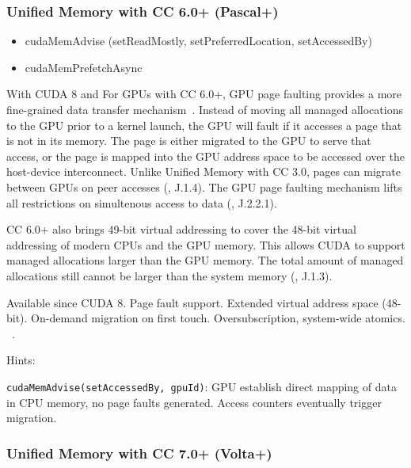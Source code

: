 
\subsubsection{Unified Memory with CC 6.0+ (Pascal+)}

\begin{itemize}
	\item cudaMemAdvise (setReadMostly, setPreferredLocation, setAccessedBy)
	\item cudaMemPrefetchAsync
\end{itemize}

With CUDA 8 and For GPUs with CC 6.0+, GPU page faulting provides a more fine-grained data transfer mechanism~\cite{nvidia2017cuda80}.
Instead of moving all managed allocations to the GPU prior to a kernel launch, the GPU will fault if it accesses a page that is not in its memory.
The page is either migrated to the GPU to serve that access, or the page is mapped into the GPU address space to be accessed over the host-device interconnect.
Unlike Unified Memory with CC 3.0, pages can migrate between GPUs on peer accesses (\cite{nvidia2017cuda80}, J.1.4).
The GPU page faulting mechanism lifts all restrictions on simultenous access to data (\cite{nvidia2017cuda80}, J.2.2.1).

CC 6.0+ also brings 49-bit virtual addressing to cover the 48-bit virtual addressing of modern CPUs and the GPU memory.
This allows CUDA to support managed allocations larger than the GPU memory.
The total amount of managed allocations still cannot be larger than the system memory (\cite{nvidia2017cuda80}, J.1.3).

Available since CUDA 8.
Page fault support.
Extended virtual address space (48-bit).
On-demand migration on first touch.
Oversubscription, system-wide atomics.
~\cite{sakharnykh2017unified}.

Hints:

\texttt{cudaMemAdvise(setAccessedBy, gpuId)}: GPU establish direct mapping of data in CPU memory, no page faults generated.
Access counters eventually trigger migration.

\subsubsection {Unified Memory with CC 7.0+ (Volta+) }

